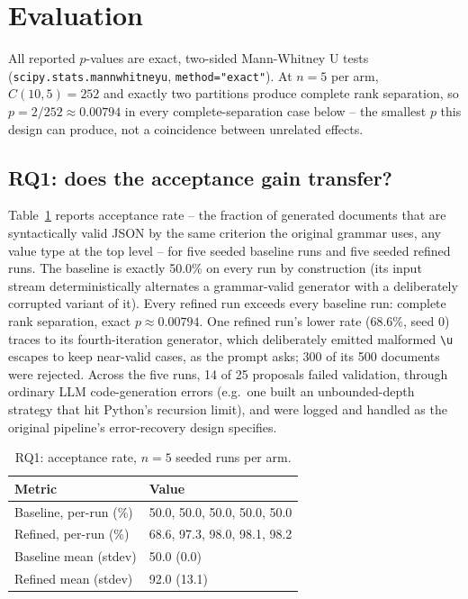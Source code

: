 \section{Evaluation}
\label{sec:evaluation}

All reported $p$-values are exact, two-sided Mann-Whitney U tests
(\texttt{scipy.stats.mannwhitneyu}, \texttt{method="exact"}). At $n{=}5$ per
arm, $C(10,5) = 252$ and exactly two partitions produce complete rank
separation, so $p = 2/252 \approx 0.00794$ in every complete-separation case
below -- the smallest $p$ this design can produce, not a coincidence between
unrelated effects.

\subsection{RQ1: does the acceptance gain transfer?}
\label{sec:evaluation-rq1}
Table~\ref{tab:rq1} reports acceptance rate -- the fraction of generated
documents that are syntactically valid JSON by the same criterion the
original grammar uses, any value type at the top level -- for five seeded
baseline runs and five seeded refined runs. The baseline is exactly 50.0\%
on every run by construction (its input stream deterministically alternates
a grammar-valid generator with a deliberately corrupted variant of it).
Every refined run exceeds every baseline run: complete rank separation,
exact $p \approx 0.00794$. One refined run's lower rate (68.6\%, seed 0)
traces to its fourth-iteration generator, which deliberately emitted
malformed \texttt{\textbackslash u} escapes to keep near-valid cases, as the
prompt asks; 300 of its 500 documents were rejected. Across the five runs, 14
of 25 proposals failed validation, through ordinary LLM code-generation errors
(e.g.\ one built an unbounded-depth strategy that hit Python's recursion
limit), and were logged and handled as the original pipeline's
error-recovery design specifies.

\begin{table}[t]
\centering
\footnotesize
\caption{RQ1: acceptance rate, $n{=}5$ seeded runs per arm.}
\label{tab:rq1}
\begin{tabularx}{\columnwidth}{@{}lX@{}}
\toprule
Metric & Value \\
\midrule
Baseline, per-run (\%) & 50.0, 50.0, 50.0, 50.0, 50.0 \\
Refined, per-run (\%) & 68.6, 97.3, 98.0, 98.1, 98.2 \\
Baseline mean (stdev) & 50.0 (0.0) \\
Refined mean (stdev) & 92.0 (13.1) \\
\bottomrule
\end{tabularx}
\end{table}

